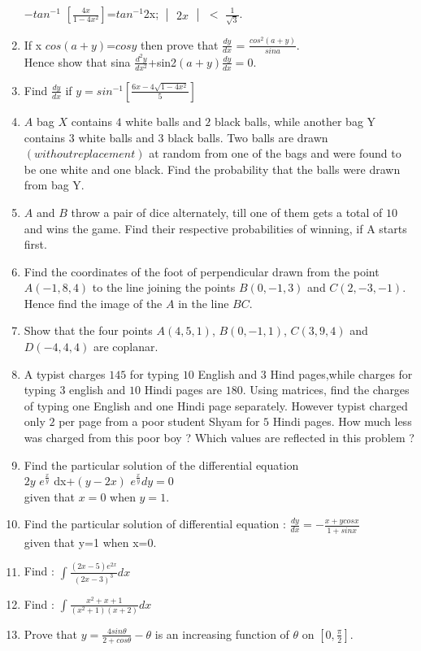 \documentclass[12pt,-letter paper]{article}
\providecommand{\mydet}[1]{\ensuremath{\begin{vmatrix}#1\end{vmatrix}}}
\providecommand{\brak}[1]{\ensuremath{\left(#1\right)}}
\begin{document}
\begin{enumerate}
$-tan^{-1}$ $[\frac{4x}{1-4x^2}]$=$tan^{-1}$2x; $\mydet{2x}$ $<$ $\frac{1}{\sqrt{3}}.$
\item If x $cos(a+y)$=$cosy$ then prove that $\frac{dy}{dx}$ = $\frac{cos^2\brak{a+y}}{sina}$. \\
Hence show that sina $\frac{d^2y}{dx^2}$+sin2\brak{a+y}$\frac{dy}{dx}=0$.
\item Find $\frac{dy}{dx}$ if $y=sin^{-1}[\frac{6x-4\sqrt{1-4x^2}}{5}]$
\item $A$ bag $X$ contains $4$ white balls and $2$ black balls, while another bag Y contains $3$ white balls and
$3$ black balls. Two balls are drawn \brak{without replacement} at random from one of the bags and were found to be one white and one black. Find the probability that the balls were drawn from bag Y.
\item $A$ and $B$ throw a pair of dice alternately, till one of them gets a total of $10$ and wins the  game. 
Find their respective probabilities of winning, if A starts first.
\item Find the coordinates of the foot of perpendicular
drawn from the point $A\brak{-1,8,4}$ to the line joining the points $B\brak{0,-1,3}$ and $C\brak{2,-3,-1}$. Hence find the image of the $A$ in the line $BC$.
\item Show that the four points $A\brak{4,5,1}$, $B\brak{0,-1, 1}$, $C\brak{3,9,4}$ and $D\brak{-4,4,4}$ are coplanar.
\item A typist charges \rupee $145$ for typing $10$ English and $3$ Hind pages,while charges for typing $3$ english and $10$ Hindi pages are \rupee $180$. Using matrices, find the charges of typing one English and one Hindi page separately. However typist charged only \rupee $2$ per page from a poor student Shyam for $5$ Hindi pages. How much less was charged from this poor boy ? Which values are reflected in this problem ? 
\item Find the particular solution of the differential equation \\ $2y$ $e^{\frac{x}{y}}$ dx+\brak{y-2x} $e^{\frac{x}{y}} dy={0}$ \\ given that $x=0$ when $y=1$.
\item Find the particular solution of differential equation : $\frac{dy}{dx}=-\frac{x+ycosx}{1+sinx}$ \\ given that y=1 when x=0.
\item Find : $\int\frac{\brak{2x-5}e^{2x}}{\brak{2x-3}^3}dx$
\item Find : $\int\frac{x^2+x+1}{\brak{x^2+1}\brak{x+2}}dx$
\item Prove that $y=\frac{4sin\theta}{2+cos\theta}-\theta$ is an increasing function of $\theta$ on $[0,\frac{\pi}{2}]$.

\end{enumerate}
\end{document}
